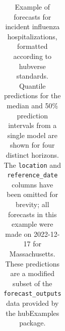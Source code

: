 \documentclass[
  letterpaper,
  DIV=11,
  numbers=noendperiod]{scrartcl}
\begin{document}
\begin{longtable}[]{@{}
  >{\raggedright\arraybackslash}p{}
  >{\raggedright\arraybackslash}p{}
  >{\raggedleft\arraybackslash}p{}
  >{\raggedright\arraybackslash}p{}
  >{\raggedright\arraybackslash}p{}
  >{\raggedleft\arraybackslash}p{}@{}}

\caption{\label{tbl-example-forecasts}Example of forecasts for incident
influenza hospitalizations, formatted according to hubverse standards.
Quantile predictions for the median and 50\% prediction intervals from a
single model are shown for four distinct horizons. The \texttt{location}
and \texttt{reference\_date} columns have been omitted for brevity; all
forecasts in this example were made on 2022-12-17 for Massachusetts.
These predictions are a modified subset of the
\texttt{forecast\_outputs} data provided by the {hubExamples} package.}

\tabularnewline


\end{longtable}
\end{document}
